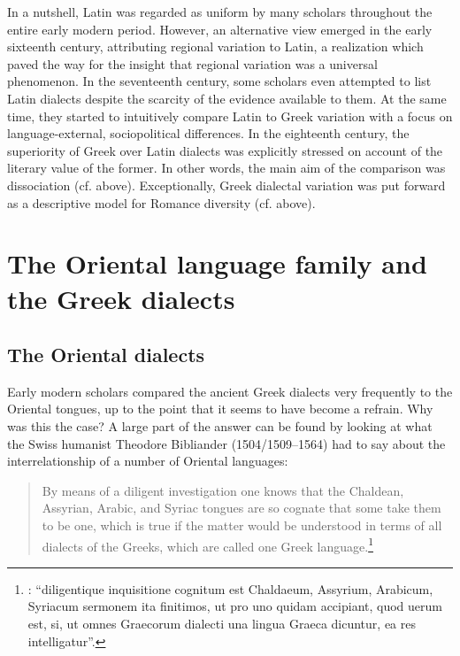 In a nutshell, Latin was regarded as uniform by many scholars throughout the entire early modern period. However, an alternative view emerged in the early sixteenth century, attributing regional variation to Latin, a realization which paved the way for the insight that regional variation was a universal phenomenon. In the seventeenth century, some scholars even attempted to list Latin dialects despite the scarcity of the evidence available to them. At the same time, they started to intuitively compare Latin to Greek variation with a focus on lan\-guage-ex\-ter\-nal, sociopolitical differences. In the eighteenth century, the superiority of Greek over Latin dialects was explicitly stressed on account of the literary value of the former. In other words, the main aim of the comparison was dissociation (cf.  above). Exceptionally, Greek dialectal variation was put forward as a descriptive model for Romance diversity (cf.  above).

\section{The Oriental language family and the Greek dialects}\label{sec:8.3}
\subsection{The Oriental dialects}\label{sec:8.3.1}

Early modern scholars compared the ancient Greek dialects very frequently to the Oriental tongues, up to the point that it seems to have become a refrain. Why was this the case? A large part of the answer can be found by looking at what the Swiss humanist Theodore Bibliander (1504/1509–1564) had to say about the interrelationship of a number of Oriental languages:

\begin{quote}
By means of a diligent investigation one knows that the Chaldean, Assyrian, Arabic, and Syriac tongues are so cognate that some take them to be one, which is true if the matter would be understood in terms of all dialects of the Greeks, which are called one Greek language.\footnote{\citet[58]{Bibliander1542}: “diligentique inquisitione cognitum est Chaldaeum, Assyrium, Arabicum, Syriacum sermonem ita finitimos, ut pro uno quidam accipiant, quod uerum est, si, ut omnes Graecorum dialecti una lingua Graeca dicuntur, ea res intelligatur”.}
\end{quote}

